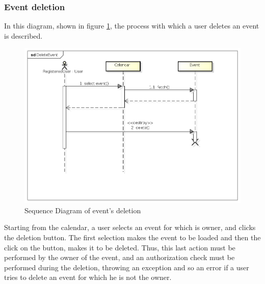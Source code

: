 \subsubsection{Event deletion}
In this diagram, shown in figure \ref{fig:delseqdiag}, the process with which a user deletes an event is described.
\begin{center}
 \begin{figure}[H]
    \includegraphics[width=1\textwidth]{./UMLDiagram/sequence/DeleteEvent/DeleteEvent.png}
    \caption{Sequence Diagram of event's deletion}
     \label{fig:delseqdiag}
     \end{figure}
   \end{center}
Starting from the calendar, a user selects an event for which is owner, and clicks the deletion button. The first selection makes the event to be loaded and then the click on the button, makes it to be deleted. Thus, this last action must be performed by the owner of the event, and an authorization check must be performed during the deletion, throwing an exception and so an error if a user tries to delete an event for which he is not the owner.
\newpage
